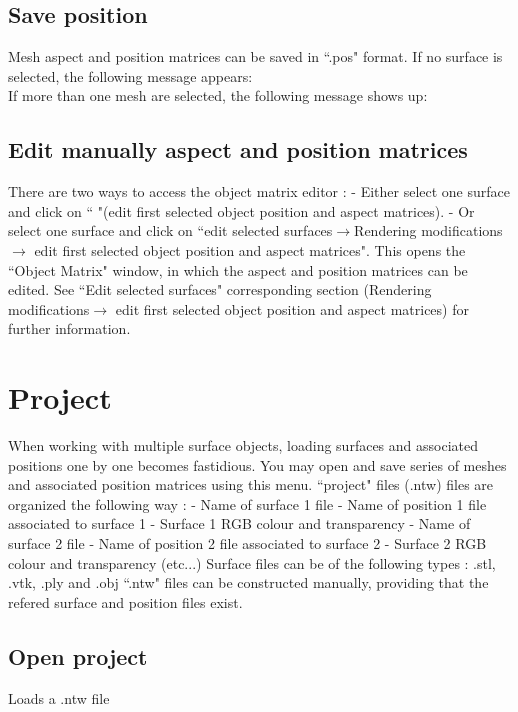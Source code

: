 \subsection{Save position}
Mesh aspect and position matrices can be saved in ``.pos" format. If no surface is selected, the
following message appears:\\

If more than one mesh are selected, the following message shows up:
\subsection{Edit manually aspect and position matrices}
There are two ways to access the object matrix editor :
- Either select one surface and click on `` "(edit first selected object position and aspect matrices).
- Or select one surface and click on ``edit selected surfaces$\rightarrow$Rendering modifications$\rightarrow$ edit first
selected object position and aspect matrices".
This opens the ``Object Matrix" window, in which the aspect and position matrices can be edited. See
``Edit selected surfaces" corresponding section (Rendering modifications$\rightarrow$ edit first selected object position and aspect matrices) for further information.


\section{Project}
When working with multiple surface objects,
loading surfaces and associated positions one
by one becomes fastidious. You may open and
save series of meshes and associated position
matrices using this menu.
``project" files (.ntw) files are organized the
following way :
- Name of surface 1 file
- Name of position 1 file associated to surface 1
- Surface 1 RGB colour and transparency
- Name of surface 2 file
- Name of position 2 file associated to surface 2
- Surface 2 RGB colour and transparency
(etc...)
Surface files can be of the following types : .stl, .vtk, .ply and .obj
``.ntw" files can be constructed manually, providing that the refered surface and position files exist.

\subsection{Open project}
Loads a .ntw file

